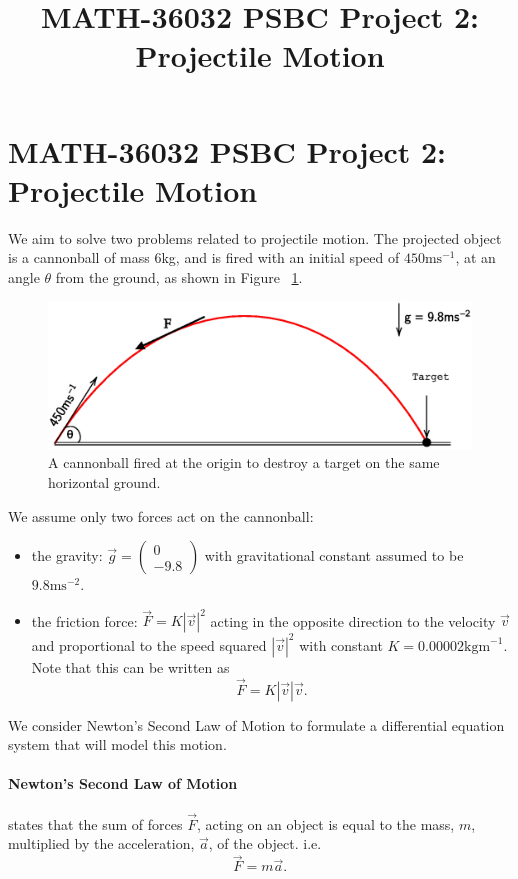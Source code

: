 \documentclass[11pt]{report}
\title{MATH-36032 PSBC Project 2: Projectile Motion}
\begin{document}
\section*{MATH-36032 PSBC Project 2: Projectile Motion}
We aim to solve two problems related to projectile motion. The projected object is a cannonball of mass $6$kg, and is fired with an initial speed of $450\text{ms}^{-1}$, at an angle $\theta$ from the ground, as shown in Figure ~\ref{fig:projectile1}.

\begin{figure}[h]
	\centering
  	\includegraphics[scale=0.5]{assets/projectile1.eps}
  	\caption{A cannonball fired at the origin to destroy a target on the same horizontal ground.}
  	\label{fig:projectile1}
\end{figure}

We assume only two forces act on the cannonball:
\begin{itemize}
	\item the gravity: $\vec{g} = \begin{pmatrix} 0 \\ -9.8 \end{pmatrix}$ with gravitational constant assumed to be $9.8\text{ms}^{-2}$.
	\item the friction force: $\vec{F}=K|\vec{v}|^2$ acting in the opposite direction to the velocity $\vec{v}$ and proportional to the speed squared $|\vec{v}|^2$ with constant $K=0.00002\text{kgm}^{-1}$. Note that this can be written as $$\vec{F}=K|\vec{v}|\vec{v}.$$
\end{itemize}

We consider Newton's Second Law of Motion to formulate a differential equation system that will model this motion.
\paragraph{Newton's Second Law of Motion} states that the sum of forces $\vec{F}$, acting on an object is equal to the mass, $m$, multiplied by the acceleration, $\vec{a}$, of the object. i.e. $$\vec{F}=m\vec{a}.$$
\end{document}
